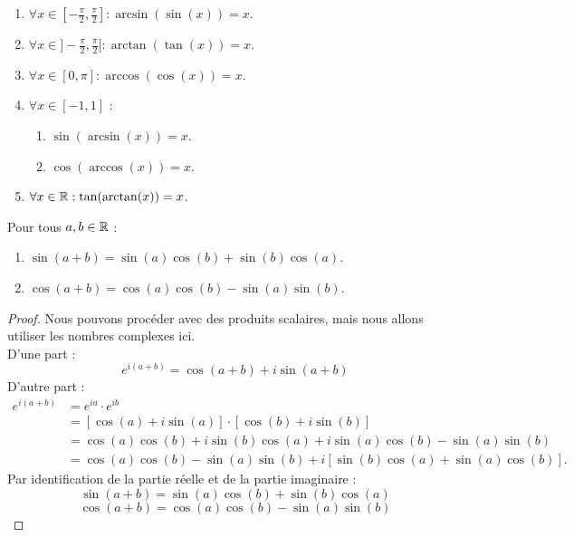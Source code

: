 \begin{proposition}
    \begin{enumerate}
    	\item $\forall x \in [-\frac{\pi}{2}, \frac{\pi}{2}] : \arcsin(\sin(x)) = x$.
        \item $\forall x \in ]-\frac{\pi}{2}, \frac{\pi}{2}[ : \arctan(\tan(x)) = x$.
        \item $\forall x \in [0, \pi] : \arccos(\cos(x)) = x$.
        \item $\forall x \in [-1, 1]$ :
        \begin{enumerate}
            \item $\sin(\arcsin(x)) = x$.
            \item $\cos(\arccos(x)) = x$.
        \end{enumerate}
        \item $\forall x \in \mathbb{R} : \tan(\arctan(x)) = x$.
    \end{enumerate}
\end{proposition}

\begin{proposition}
	Pour tous $a, b \in \mathbb{R}$ :
    \begin{enumerate}
        \item $\sin(a + b) = \sin(a) \cos(b) + \sin(b) \cos(a)$.
        \item $\cos(a + b) = \cos(a) \cos(b) - \sin(a) \sin(b)$.
    \end{enumerate}
\end{proposition}

\begin{proof}
    Nous pouvons procéder avec des produits scalaires, mais nous allons utiliser les nombres complexes ici.
    \\
    D'une part :
    \[e^{i (a + b)} = \cos(a + b) + i\sin(a + b)\]
    D'autre part :
    \begin{align*}
        e^{i (a + b)} &= e^{ia} \cdot e^{ib} \\
        &= [\cos(a) + i \sin(a)] \cdot [\cos(b) + i \sin(b)] \\
        &= \cos(a) \cos(b) + i\sin(b)\cos(a) + i\sin(a)\cos(b) - \sin(a)\sin(b) \\
        &= \cos(a)\cos(b) - \sin(a)\sin(b) + i [\sin(b)\cos(a) + \sin(a) \cos(b)].
    \end{align*}
    Par identification de la partie réelle et de la partie imaginaire :
    \[ \sin(a + b) = \sin(a) \cos(b) + \sin(b) \cos(a) \]
	\[ \cos(a + b) = \cos(a) \cos(b) - \sin(a) \sin(b) \]
\end{proof}

